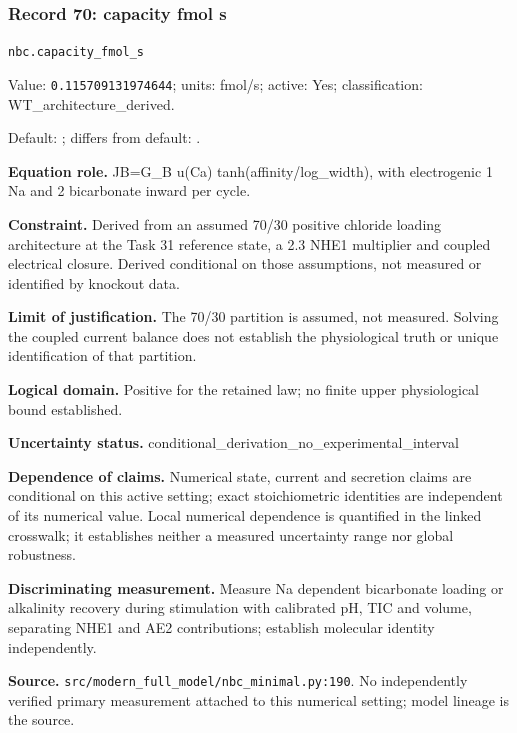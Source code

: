 \subsubsection*{Record 70: capacity fmol s}
{\small \nolinkurl{nbc.capacity_fmol_s}\par

Value: \texttt{0.115709131974644}; units: fmol/s; active: Yes; classification: WT\_architecture\_derived.\par

Default: ; differs from default: .\par

\textbf{Equation role.} JB=G\_B u(Ca) tanh(affinity/log\_width), with electrogenic 1 Na and 2 bicarbonate inward per cycle.\par

\textbf{Constraint.} Derived from an assumed 70/30 positive chloride loading architecture at the Task 31 reference state, a 2.3 NHE1 multiplier and coupled electrical closure. Derived conditional on those assumptions, not measured or identified by knockout data.\par

\textbf{Limit of justification.} The 70/30 partition is assumed, not measured. Solving the coupled current balance does not establish the physiological truth or unique identification of that partition.\par

\textbf{Logical domain.} Positive for the retained law; no finite upper physiological bound established.\par

\textbf{Uncertainty status.} conditional\_derivation\_no\_experimental\_interval\par

\textbf{Dependence of claims.} Numerical state, current and secretion claims are conditional on this active setting; exact stoichiometric identities are independent of its numerical value. Local numerical dependence is quantified in the linked crosswalk; it establishes neither a measured uncertainty range nor global robustness.\par

\textbf{Discriminating measurement.} Measure Na dependent bicarbonate loading or alkalinity recovery during stimulation with calibrated pH, TIC and volume, separating NHE1 and AE2 contributions; establish molecular identity independently.\par

\textbf{Source.} \nolinkurl{src/modern_full_model/nbc_minimal.py:190}. No independently verified primary measurement attached to this numerical setting; model lineage is the source.\par}

